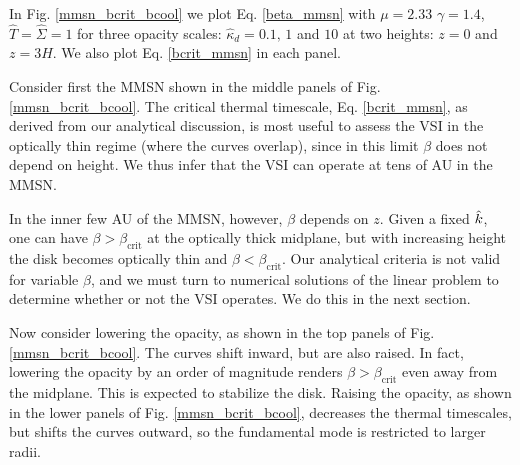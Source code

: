 In Fig. \ref{mmsn_bcrit_bcool} we plot Eq. \ref{beta_mmsn}  with $\mu
=2.33$ $\gamma=1.4$, $\hat{T}=\hat{\Sigma}=1$ for three
opacity scales: $\hat{\kappa}_d=0.1, \,1 $ and $10$ at two heights:
$z=0$ and $z=3H$. We also plot Eq. \ref{bcrit_mmsn} in each panel. 

Consider first the MMSN shown in the middle panels of 
Fig. \ref{mmsn_bcrit_bcool}. The critical thermal timescale,
Eq. \ref{bcrit_mmsn}, as derived from our analytical discussion, is
most useful to assess the VSI in the optically thin regime (where the
curves overlap), since in this limit $\beta$ does not depend on
height. We thus infer that the VSI can operate at tens of AU in the
MMSN.  

In the inner few AU of the MMSN, however, $\beta$ depends on $z$. 
Given a fixed $\hat{k}$, one can have $\beta > \beta_\mathrm{crit}$ at
the optically thick midplane, but with increasing height the disk 
becomes optically thin and $\beta<\beta_\mathrm{crit}$. Our analytical
criteria is not valid for variable $\beta$, and we must turn to
numerical solutions of the linear problem to determine whether or not
the VSI operates. We do this in the next section.   
 
Now consider lowering the opacity, as shown in the top panels of
Fig. \ref{mmsn_bcrit_bcool}. The curves shift inward, but are also
raised. In fact, lowering the opacity by an order of magnitude renders 
$\beta > \beta_\mathrm{crit}$ even away from the midplane. This is
expected to stabilize the disk. Raising the opacity, as shown in 
the lower panels of Fig. \ref{mmsn_bcrit_bcool}, decreases the thermal
timescales, but shifts the curves outward, so the fundamental mode is
restricted to larger radii.  


